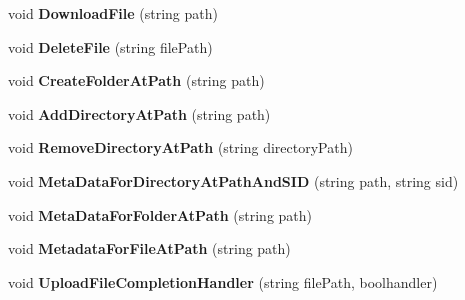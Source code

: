 \begin{DoxyCompactItemize}
\item 
\hypertarget{class_cloud_api_public_1_1_c_l_rest_client_a9fa5953787ae47ca6bad745abfffdc06}{void {\bfseries Download\-File} (string path)}\label{class_cloud_api_public_1_1_c_l_rest_client_a9fa5953787ae47ca6bad745abfffdc06}

\item 
\hypertarget{class_cloud_api_public_1_1_c_l_rest_client_ae3af818ddea76ea9e7e7de2a84693c35}{void {\bfseries Delete\-File} (string file\-Path)}\label{class_cloud_api_public_1_1_c_l_rest_client_ae3af818ddea76ea9e7e7de2a84693c35}

\item 
\hypertarget{class_cloud_api_public_1_1_c_l_rest_client_a5d74084a3af64906016edfa82c965557}{void {\bfseries Create\-Folder\-At\-Path} (string path)}\label{class_cloud_api_public_1_1_c_l_rest_client_a5d74084a3af64906016edfa82c965557}

\item 
\hypertarget{class_cloud_api_public_1_1_c_l_rest_client_a7fe4a1693265e173aa3c6443c9776356}{void {\bfseries Add\-Directory\-At\-Path} (string path)}\label{class_cloud_api_public_1_1_c_l_rest_client_a7fe4a1693265e173aa3c6443c9776356}

\item 
\hypertarget{class_cloud_api_public_1_1_c_l_rest_client_ae932d72478bb3c7b7a579f2b3573e0f8}{void {\bfseries Remove\-Directory\-At\-Path} (string directory\-Path)}\label{class_cloud_api_public_1_1_c_l_rest_client_ae932d72478bb3c7b7a579f2b3573e0f8}

\item 
\hypertarget{class_cloud_api_public_1_1_c_l_rest_client_a25a2ae11b198c0d348ef9fd8ad8075cd}{void {\bfseries Meta\-Data\-For\-Directory\-At\-Path\-And\-S\-I\-D} (string path, string sid)}\label{class_cloud_api_public_1_1_c_l_rest_client_a25a2ae11b198c0d348ef9fd8ad8075cd}

\item 
\hypertarget{class_cloud_api_public_1_1_c_l_rest_client_aa715cbc965b9416ab32d0e7e231a0395}{void {\bfseries Meta\-Data\-For\-Folder\-At\-Path} (string path)}\label{class_cloud_api_public_1_1_c_l_rest_client_aa715cbc965b9416ab32d0e7e231a0395}

\item 
\hypertarget{class_cloud_api_public_1_1_c_l_rest_client_ac633b4bb7057a0a004e1b59d07b060a9}{void {\bfseries Metadata\-For\-File\-At\-Path} (string path)}\label{class_cloud_api_public_1_1_c_l_rest_client_ac633b4bb7057a0a004e1b59d07b060a9}

\item 
\hypertarget{class_cloud_api_public_1_1_c_l_rest_client_ae332f0b6dcc37965c1a68356f074534a}{void {\bfseries Upload\-File\-Completion\-Handler} (string file\-Path, boolhandler)}\label{class_cloud_api_public_1_1_c_l_rest_client_ae332f0b6dcc37965c1a68356f074534a}

\end{DoxyCompactItemize}
